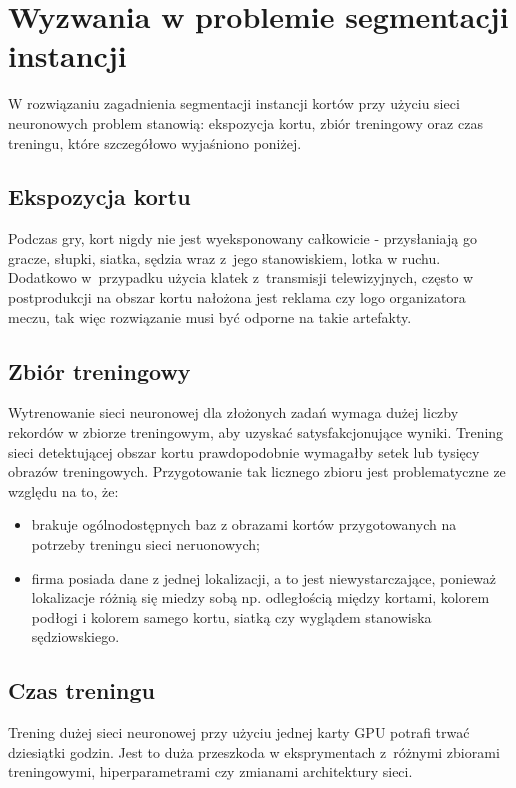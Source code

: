 \section{Wyzwania w problemie segmentacji instancji}
\label{sec:wyzwania}

W rozwiązaniu zagadnienia segmentacji instancji kortów przy użyciu sieci neuronowych problem stanowią: ekspozycja kortu, zbiór treningowy oraz czas treningu, które szczegółowo wyjaśniono poniżej.

\subsection*{Ekspozycja kortu}

Podczas gry, kort nigdy nie jest wyeksponowany całkowicie - przysłaniają go gracze, słupki, siatka, sędzia wraz z~jego stanowiskiem, lotka w ruchu.
Dodatkowo w~przypadku użycia klatek z~transmisji telewizyjnych, często w postprodukcji na obszar kortu nałożona jest reklama czy logo organizatora meczu,  tak więc rozwiązanie musi być odporne na takie artefakty.

\subsection*{Zbiór treningowy}

Wytrenowanie sieci neuronowej dla złożonych zadań wymaga dużej liczby rekordów w zbiorze treningowym, aby uzyskać satysfakcjonujące wyniki.
Trening sieci detektującej obszar kortu prawdopodobnie wymagałby setek lub tysięcy obrazów treningowych.
Przygotowanie tak licznego zbioru jest problematyczne ze względu na to, że:

\begin{itemize}
	\item brakuje ogólnodostępnych baz z obrazami kortów przygotowanych na potrzeby treningu sieci neruonowych;
	\item firma posiada dane z jednej lokalizacji, a to jest niewystarczające, ponieważ lokalizacje różnią się miedzy sobą np. odległością między kortami, kolorem podłogi i kolorem samego kortu, siatką czy wyglądem stanowiska sędziowskiego.
\end{itemize}

\subsection*{Czas treningu}

Trening dużej sieci neuronowej przy użyciu jednej karty GPU potrafi trwać dziesiątki godzin.
Jest to duża przeszkoda w eksprymentach z~różnymi zbiorami treningowymi, hiperparametrami czy zmianami architektury sieci.
